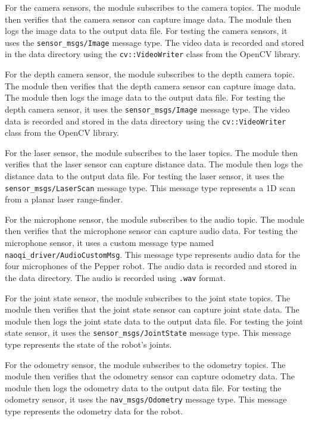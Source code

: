 \documentclass{CSSRforAfrica}
\begin{document}
For the camera sensors, the module subscribes to the camera topics. The module then verifies that the camera sensor can capture image data. The
module then logs the image data to the output data file. For testing the camera sensors, it uses the \texttt{sensor\_msgs/Image} message type. The video data is recorded and stored in the data directory using the \texttt{cv::VideoWriter} class from the 
OpenCV library.

For the depth camera sensor, the module subscribes to the depth camera topic. The module then verifies that the depth camera sensor can capture image data. The
module then logs the image data to the output data file. For testing the depth camera sensor, it uses the \texttt{sensor\_msgs/Image} message type. The video data is recorded and stored in the data directory using the \texttt{cv::VideoWriter} class from the OpenCV library.

For the laser sensor, the module subscribes to the laser topics. The module then verifies that the laser sensor can capture distance data. The
module then logs the distance data to the output data file. For testing the laser sensor, it uses the \texttt{sensor\_msgs/LaserScan} message type. This message type
represents a 1D scan from a planar laser range-finder.

For the microphone sensor, the module subscribes to the audio topic. The module then verifies that the microphone sensor can capture audio data. For testing the 
microphone sensor, it uses a custom message type named \texttt{naoqi\_driver/AudioCustomMsg}. This message type represents audio data for the four microphones of the Pepper 
robot. The audio data is recorded and stored in the data directory. The audio is recorded using \texttt{.wav} format. 

For the joint state sensor, the module subscribes to the joint state topics. The module then verifies that the joint state sensor can capture joint state data. The
module then logs the joint state data to the output data file. For testing the joint state sensor, it uses the \texttt{sensor\_msgs/JointState} message type. This message type
represents the state of the robot's joints.

For the odometry sensor, the module subscribes to the odometry topics. The module then verifies that the odometry sensor can capture odometry data. The
module then logs the odometry data to the output data file. For testing the odometry sensor, it uses the \texttt{nav\_msgs/Odometry} message type. This message type
represents the odometry data for the robot.
\end{document}
